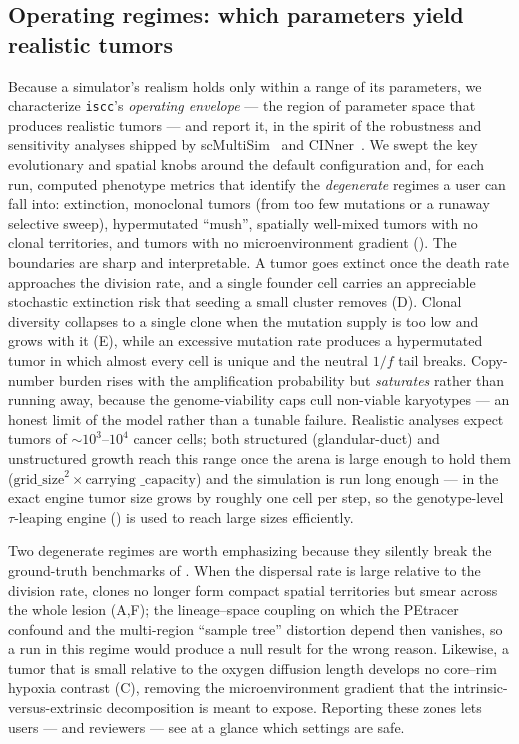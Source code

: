 \documentclass{article}
\begin{document}
\subsection{Operating regimes: which parameters yield realistic tumors}
\label{sec:envelope}
Because a simulator's realism holds only within a range of its parameters, we characterize
\texttt{iscc}'s \emph{operating envelope} --- the region of parameter space that produces realistic
tumors --- and report it, in the spirit of the robustness and sensitivity analyses shipped by
scMultiSim~\cite{li_scmultisim_2025} and CINner~\cite{dinh_cinner_2025}. We swept the key evolutionary
and spatial knobs around the default configuration and, for each run, computed phenotype metrics that
identify the \emph{degenerate} regimes a user can fall into: extinction, monoclonal tumors (from too
few mutations or a runaway selective sweep), hypermutated ``mush'', spatially well-mixed tumors with
no clonal territories, and tumors with no microenvironment gradient (). The
boundaries are sharp and interpretable. A tumor goes extinct once the death rate approaches the
division rate, and a single founder cell carries an appreciable stochastic extinction risk that
seeding a small cluster removes (D). Clonal diversity collapses to a single clone
when the mutation supply is too low and grows with it (E), while an excessive
mutation rate produces a hypermutated tumor in which almost every cell is unique and the neutral
$1/f$ tail breaks. Copy-number burden rises with the amplification probability but \emph{saturates}
rather than running away, because the genome-viability caps cull non-viable karyotypes --- an
honest limit of the model rather than a tunable failure. Realistic analyses expect tumors of
$\sim$$10^3$--$10^4$ cancer cells; both structured (glandular-duct) and unstructured growth reach
this range once the arena is large enough to hold them ($\text{grid\_size}^2\times\text{carrying
\_capacity}$) and the simulation is run long enough --- in the exact engine tumor size grows by
roughly one cell per step, so the genotype-level $\tau$-leaping engine () is
used to reach large sizes efficiently.

Two degenerate regimes are worth emphasizing because they silently break the ground-truth benchmarks
of . When the dispersal rate is large relative to the division
rate, clones no longer form compact spatial territories but smear across the whole lesion
(A,F); the lineage--space coupling on which the PEtracer confound and the
multi-region ``sample tree'' distortion depend then vanishes, so a run in this regime would produce a
null result for the wrong reason. Likewise, a tumor that is small relative to the oxygen diffusion
length develops no core--rim hypoxia contrast (C), removing the microenvironment
gradient that the intrinsic-versus-extrinsic decomposition is meant to expose. Reporting these zones
lets users --- and reviewers --- see at a glance which settings are safe.
\end{document}
